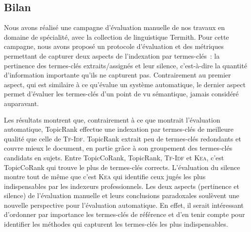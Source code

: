     \subsection{Bilan}
    \label{subsec:main-domain_specific_keyphrase_annotation-manual_evaluation-conclusion}
      Nous avons réalisé une campagne d'évaluation manuelle de nos travaux en
      domaine de spécialité, avec la collection de linguistique Termith. Pour
      cette campagne, nous avons proposé un protocole d'évaluation et des
      métriques permettant de capturer deux aspects de l'indexation par
      termes-clés~: la pertinence des termes-clés extraits/assignés et leur
      silence, c'est-à-dire la quantité d'information importante qu'ils ne
      capturent pas. Contrairement au premier aspect, qui est similaire à ce
      qu'évalue un système automatique, le dernier aspect permet d'évaluer les
      termes-clés d'un point de vu sémantique, jamais considéré auparavant.

      Les résultats montrent que, contrairement à ce que montrait l'évaluation
      automatique, TopicRank effectue une indexation par termes-clés de
      meilleure qualité que celle de \textsc{Tf-Idf}. TopicRank extrait peu de
      termes-clés redondants et couvre mieux le document, en partie grâce à son
      groupement des termes-clés candidats en sujets. Entre TopicCoRank,
      TopicRank, \textsc{Tf-Idf} et \textsc{Kea}, c'est TopicCoRank qui trouve
      le plus de termes-clés corrects. L'évaluation du silence montre tout de
      même que c'est \textsc{Kea} qui identifie ceux jugés les plus
      indispensables par les indexeurs professionnels. Les deux aspects
      (pertinence et silence) de l'évaluation manuelle et leurs conclusions
      paradoxales soulèvent une nouvelle perspective pour l'évaluation
      automatique. En effet, il serait intéressant d'ordonner par importance les
      termes-clés de référence et d'en tenir compte pour identifier les méthodes
      qui capturent les termes-clés les plus indispensables.

